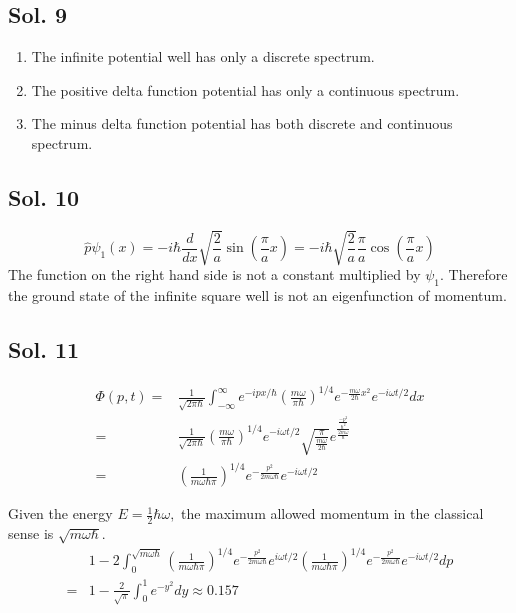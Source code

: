 \subsection*{Sol. 9}
\begin{enumerate}
    \item The infinite potential well has only a discrete spectrum.
    \item The positive delta function potential has only a continuous spectrum. 
    \item The minus delta function potential has both discrete and continuous spectrum.
\end{enumerate}

\subsection*{Sol. 10}
$$
\hat{p}\psi_1
(x)=-i\hbar\frac{d}{dx}\sqrt{\frac{2}{a}}\sin\left(\frac{\pi}{a}x\right)
=-i\hbar\sqrt{\frac{2}{a}}\frac{\pi}{a}\cos\left(\frac{\pi}{a}x\right)
$$
The function on the right hand side is not a constant multiplied by $\psi_1.$ Therefore the ground state of the infinite square well is not an eigenfunction of momentum.

\subsection*{Sol. 11}
\begin{align*}
    \Phi(p,t)=&
    \frac{1}{\sqrt{2\pi\hbar}}
    \int_{-\infty}^{\infty}
    e^{-ipx/\hbar}
    \left(\frac{m\omega}{\pi\hbar}\right)^{1/4}
    e^{-\frac{m\omega}{2\hbar}x^2}
    e^{-i\omega t/2}dx\\
    =&
    \frac{1}{\sqrt{2\pi\hbar}}
    \left(\frac{m\omega}{\pi\hbar}\right)^{1/4}
    e^{-i\omega t/2}
    \sqrt{\frac{\pi}{\frac{m\omega}{2\hbar}}}
    e^{\frac{\frac{-p^2}{\hbar^2}}{\frac{2m\omega}{\hbar}}}\\
    =&\left(\frac{1}{m\omega\hbar\pi}\right)^{1/4}
    e^{-\frac{p^2}{2m\omega\hbar}}e^{-i\omega t/2}
\end{align*}

Given the energy $E=\frac{1}{2}\hbar\omega,$ the maximum allowed momentum in the classical sense is $\sqrt{m\omega\hbar}.$
\begin{align*}
    &1-2\int_0^{\sqrt{m\omega\hbar}}
    \left(\frac{1}{m\omega\hbar\pi}\right)^{1/4}
    e^{-\frac{p^2}{2m\omega\hbar}}e^{i\omega t/2}
    \left(\frac{1}{m\omega\hbar\pi}\right)^{1/4}
    e^{-\frac{p^2}{2m\omega\hbar}}e^{-i\omega t/2}dp\\
    =&
    1-\frac{2}{\sqrt{\pi}}
    \int_0^1e^{-y^2}dy\approx 0.157
\end{align*}

